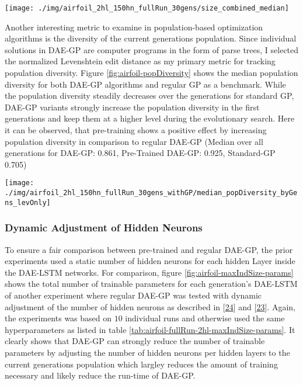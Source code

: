 \documentclass[
  11pt,
]{article}
\let\origfigure\figure
\let\endorigfigure\endfigure
\renewenvironment{figure}[1][2] {
    \expandafter\origfigure\expandafter[H]
} {
    \endorigfigure
}
\begin{document}
\begin{figure}[c]

{\centering \texttt{[image: ./img/airfoil\_2hl\_150hn\_fullRun\_30gens/size\_combined\_median]} 

}

\caption{Median Solution Size over 30 Generations - Airfoil}\label{fig:airfoil-size-combined-30gens}
\end{figure}

Another interesting metric to examine in population-based optimization algorithms is the diversity of the current generations population. Since individual solutions in DAE-GP are computer programs in the form of parse trees, I selected the normalized Levenshtein edit distance as my primary metric for tracking population diversity. Figure \ref{fig:airfoil-popDiversity} shows the median population diversity for both DAE-GP algorithms and regular GP as a benchmark. While the population diversity steadily decreases over the generations for standard GP, DAE-GP variants strongly increase the population diversity in the first generations and keep them at a higher level during the evolutionary search. Here it can be observed, that pre-training shows a positive effect by increasing population diversity in comparison to regular DAE-GP (Median over all generations for DAE-GP: 0.861, Pre-Trained DAE-GP: 0.925, Standard-GP 0.705)

\begin{figure}[c]

{\centering \texttt{[image: ./img/airfoil\_2hl\_150hn\_fullRun\_30gens\_withGP/median\_popDiversity\_byGens\_levOnly]} 

}

\caption{Median Population Diversity over 30 Generations - Airfoil}\label{fig:airfoil-popDiversity}
\end{figure}

\hypertarget{dynamic-adjustment-of-hidden-neurons}{%
\subsubsection{Dynamic Adjustment of Hidden Neurons}\label{dynamic-adjustment-of-hidden-neurons}}

To ensure a fair comparison between pre-trained and regular DAE-GP, the prior experiments used a static number of hidden neurons for each hidden Layer inside the DAE-LSTM networks. For comparison, figure \ref{fig:airfoil-maxIndSize-params} shows the total number of trainable parameters for each generation's DAE-LSTM of another experiment where regular DAE-GP was tested with dynamic adjustment of the number of hidden neurons as described in {[}\protect\hyperlink{ref-dae-gp_2020_rtree}{24}{]} and {[}\protect\hyperlink{ref-dae-gp_2022_symreg}{23}{]}. Again, the experiments was based on \(10\) individual runs and otherwise used the same hyperparameters as listed in table \ref{tab:airfoil-fullRun-2hl-maxIndSize-params}. It clearly shows that DAE-GP can strongly reduce the number of trainable parameters by adjusting the number of hidden neurons per hidden layers to the current generations population which largley reduces the amount of training necessary and likely reduce the run-time of DAE-GP.
\end{document}
